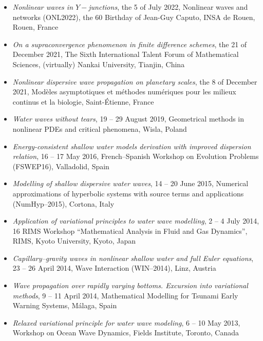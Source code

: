\documentclass[final, a4paper, oneside, 12pt]{article}
\numberwithin{equation}{section}
\begin{document}
\begin{itemize}

  \item \textit{Nonlinear waves in $Y-$junctions}, the 5 of July 2022, Nonlinear waves and networks (ONL2022), the $60$ Birthday of Jean-Guy Caputo, INSA de Rouen, Rouen, France

  \item \textit{On a supraconvergence phenomenon in finite difference schemes}, the 21 of December 2021, The Sixth International Talent Forum of Mathematical Sciences, (virtually) Nankai University, Tianjin, China

  \item \textit{Nonlinear dispersive wave propagation on planetary scales}, the 8 of December 2021, Mod\`eles asymptotiques et m\'ethodes num\'eriques pour les milieux continus et la biologie, Saint-\'Etienne, France

  \item \textit{Water waves without tears}, 19 -- 29 August 2019, Geometrical methods in nonlinear PDEs and critical phenomena, Wisla, Poland

  \item \textit{Energy-consistent shallow water models derivation with improved dispersion relation}, 16 -- 17 May 2016, French--Spanish Workshop on Evolution Problems (FSWEP16), Valladolid, Spain

  \item \textit{Modelling of shallow dispersive water waves}, 14 -- 20 June 2015, Numerical approximations of hyperbolic systems with source terms and applications (NumHyp--2015), Cortona, Italy

  \item \textit{Application of variational principles to water wave modelling}, 2 -- 4 July 2014, 16 RIMS Workshop ``Mathematical Analysis in Fluid and Gas Dynamics'', RIMS, Kyoto University, Kyoto, Japan

  \item \textit{Capillary--gravity waves in nonlinear shallow water and full Euler equations}, 23 -- 26 April 2014, Wave Interaction (WIN--2014), Linz, Austria

  \item \textit{Wave propagation over rapidly varying bottoms. Excursion into variational methods}, 9 -- 11 April 2014, Mathematical Modelling for Tsunami Early Warning Systems, M\'alaga, Spain

  \item \textit{Relaxed variational principle for water wave modeling}, 6 -- 10 May 2013, Workshop on Ocean Wave Dynamics, Fields Institute, Toronto, Canada


\end{itemize}
\end{document}
